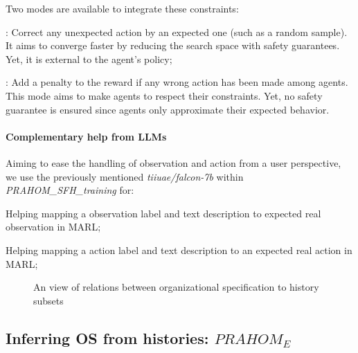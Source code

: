 \documentclass[runningheads]{llncs}
\newcounter{relation}
\begin{document}
Two modes are available to integrate these constraints:
%
\begin{enumerate*}[label=\roman*),itemjoin={;\quad}]
    \item {}: Correct any unexpected action by an expected one (such as a random sample). It aims to converge faster by reducing the search space with safety guarantees. Yet, it is external to the agent's policy;
    \item {}: Add a penalty to the reward if any wrong action has been made among agents. This mode aims to make agents  to respect their constraints. Yet, no safety guarantee is ensured since agents only approximate their expected behavior.
\end{enumerate*}

\paragraph{Complementary help from LLMs}

Aiming to ease the handling of observation and action from a user perspective, we use the previously mentioned \emph{tiiuae/falcon-7b} within \emph{PRAHOM\_SFH\_training} for:
\begin{enumerate*}[label=\roman*),itemjoin={;\quad}]
    \item Helping mapping a observation label and text description to expected real observation in MARL;
    \item Helping mapping a action label and text description to an expected real action in MARL;
\end{enumerate*}

\begin{figure}
    \centering
    
    \caption{An view of relations between organizational specification to history subsets}
    \label{fig:PRAHOM_osm_rels}
\end{figure}

\subsection{\textbf{Inferring OS from histories: $PRAHOM_E$}}


\end{document}
